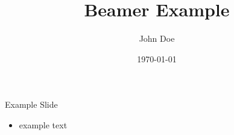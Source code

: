 \documentclass{beamer}
\title{Beamer Example}
\author{John Doe}
\date{\today}
\begin{document}
    \begin{frame}[plain]
        \maketitle
    \end{frame}

    \begin{frame}{Example Slide}
        \begin{itemize}
            \item example text
        \end{itemize}
    \end{frame}
\end{document}
